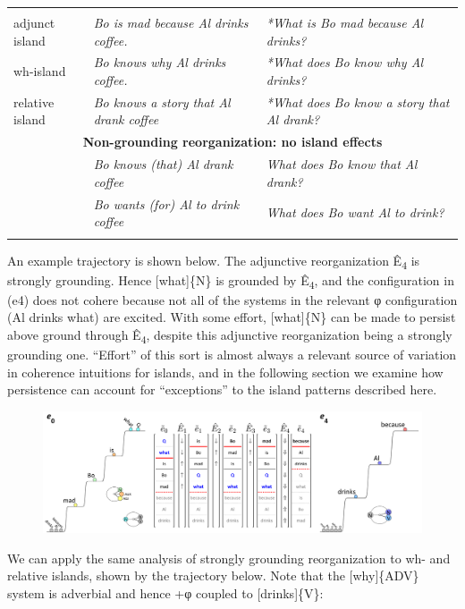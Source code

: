 \begin{tabularx}{\textwidth}{XXX}
\lsptoprule
\multicolumn{3}{c}{\textbf{Strongly grounding reorganization: island effects}}\\
adjunct island & \textit{Bo is mad because Al drinks coffee.} & \textit{*What is Bo mad because Al drinks?}\\
wh-island & \textit{Bo knows why Al drinks coffee.} & \textit{*What does Bo know why Al drinks?}\\
relative island & \textit{Bo knows a story that Al drank coffee} & \textit{*What does Bo know a story that Al drank?}\\
\multicolumn{3}{c}{\textbf{Non-grounding reorganization: no island effects}}\\
& \textit{Bo knows (that) Al drank coffee} & \textit{What does Bo know that Al drank?}\\
& \textit{Bo wants (for) Al to drink coffee} & \textit{What does Bo want Al to drink?}\\
\lspbottomrule
\end{tabularx}
  An example trajectory is shown below. The adjunctive reorganization Ê\textsubscript{4} is strongly grounding. Hence [what]\{N\} is grounded by Ê\textsubscript{4}, and the configuration in (e4) does not cohere because not all of the systems in the relevant φ configuration ({\textbar}Al drinks what{\textbar}) are excited. With some effort, [what]\{N\} can be made to persist above ground through Ê\textsubscript{4}, despite this adjunctive reorganization being a strongly grounding one. “Effort” of this sort is almost always a relevant source of variation in coherence intuitions for islands, and in the following section we examine how persistence can account for “exceptions” to the island patterns described here.

  
\begin{figure}
\includegraphics[width=\textwidth]{figures/Tilsen-img163.png}
\caption{\missingcaption}
\label{fig:}
\end{figure}
 

  We can apply the same analysis of strongly grounding reorganization to wh- and relative islands, shown by the trajectory below. Note that the [why]\{ADV\} system is adverbial and hence +φ coupled to [drinks]\{V\}:

